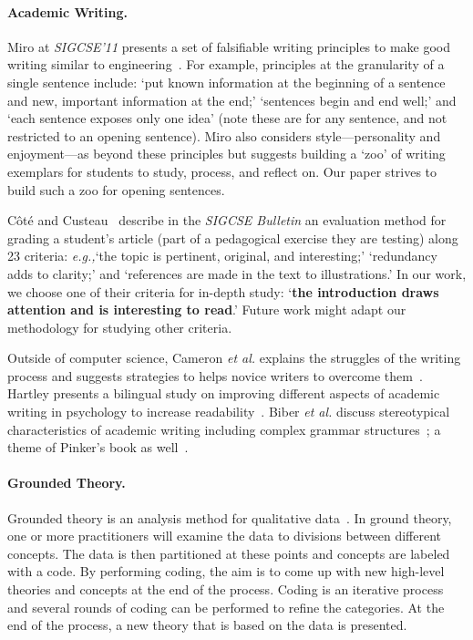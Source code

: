 \documentclass[sigconf]{acmart}
\newcommand{\etal}{\textit{et al.}\xspace}
\newcommand{\eg}{\textit{e.g.,}\xspace}
\begin{document}
\paragraph{Academic Writing.}  Miro at \textit{SIGCSE'11} presents a set of falsifiable writing principles to make good writing similar to engineering~\cite{Mir11}. For example, principles at the granularity of a single sentence include: `put known information at the beginning of a sentence and new, important information at the end;' `sentences begin and end well;' and `each sentence exposes only one idea' (note these are for any sentence, and not restricted to an opening sentence). Miro also considers style---personality and enjoyment---as beyond these principles but suggests building a `zoo' of writing exemplars for students to study, process, and reflect on. Our paper strives to build such a zoo for opening sentences. 

Côté and Custeau~\cite{CC92} describe in the \textit{SIGCSE Bulletin} an evaluation method for grading a student's article (part of a pedagogical exercise they are testing) along 23 criteria: \eg `the topic is pertinent, original, and interesting;' `redundancy adds to clarity;' and `references are made in the text to illustrations.' In our work, we choose one of their criteria for in-depth study: `\textbf{the introduction draws attention and is interesting to read}.' Future work might adapt our methodology for studying other criteria.

Outside of computer science, Cameron \etal explains the struggles of the writing process and suggests strategies to helps novice writers to overcome them~\cite{cameron2009demystifying}. Hartley presents a bilingual study on improving different aspects of academic writing in psychology to increase readability~\cite{hartley2012new}. Biber \etal discuss stereotypical characteristics of academic writing including complex grammar structures~\cite{biber2010challenging}; a theme of Pinker's book as well~\cite{Pin15}.

\paragraph{Grounded Theory.} Grounded theory is an analysis method for qualitative data~\cite{glaser1968discovery}. In ground theory, one or more practitioners will examine the data to divisions between different concepts. The data is then partitioned at these points and concepts are labeled with a code. By performing coding, the aim is to come up with new high-level theories and concepts at the end of the process. Coding is an iterative process and several rounds of coding can be performed to refine the categories. At the end of the process, a new theory that is based on the data is presented.
\end{document}
